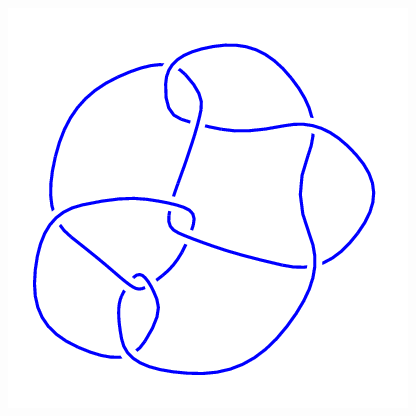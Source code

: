 \begin{figure}[H]
\begin{minipage}[b]{.18\linewidth}
    \end{minipage}
    \begin{minipage}[b]{.18\linewidth}
        \centering
        \includegraphics[width=\linewidth]{../data/10_136.png}
    \end{minipage}
\end{figure}
